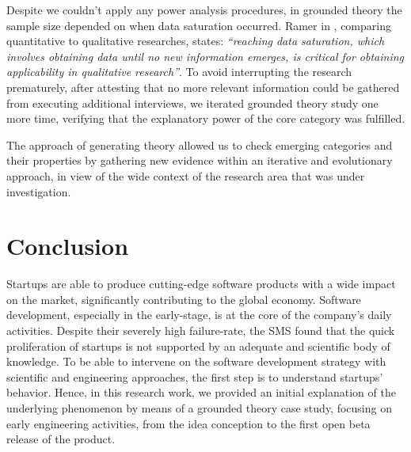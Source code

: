 \documentclass[10pt,journal,letterpaper,compsoc]{IEEEtran}
\begin{document}
Despite we couldn't apply any power analysis procedures, in grounded theory the
sample size depended on when data saturation occurred. Ramer in \cite{Ramer},
comparing quantitative to qualitative researches, states: \textit{``reaching
data saturation, which involves obtaining data until no new information emerges,
is critical for obtaining applicability in qualitative research''}. To avoid
interrupting the research prematurely, after attesting that no more relevant
information could be gathered from executing additional interviews, we iterated
grounded theory study one more time, verifying that the explanatory power of the
core category was fulfilled.

The  approach of generating theory allowed us to check emerging categories  and
their properties by gathering new evidence within an iterative and  evolutionary
approach, in view of the wide context of the research area that was  under
investigation.



\section{Conclusion} \label{conc} 
Startups are able to produce cutting-edge software products with a wide impact  
on the market, significantly contributing to the global economy. Software  
development, especially in the early-stage, is at the core of the company's  
daily activities. Despite their severely high failure-rate, the SMS \cite{SMS}  
found that the quick proliferation of startups is not supported by an adequate  
and scientific body of knowledge. %
To be able to intervene on the software development strategy with scientific and 
engineering approaches, the first step is to understand startups' behavior.  
Hence, in this research work, we provided an initial explanation of the  
underlying phenomenon by means of a grounded theory case study, focusing on  
early engineering activities, from the idea conception to the first open beta  
release of the product.
\end{document}
